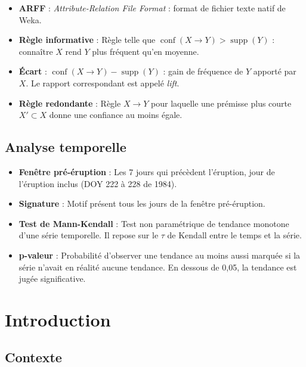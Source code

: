 \documentclass[12pt, a4paper]{article}
\begin{document}
\begin{itemize}[itemsep=3pt]
  \item \textbf{\color{NuitBleue}ARFF} : \emph{Attribute-Relation File Format} : format de fichier texte natif de Weka.
  \item \textbf{\color{NuitBleue}Règle informative} : Règle telle que $\operatorname{conf}(X \rightarrow Y) > \operatorname{supp}(Y)$ : connaître $X$ rend $Y$ plus fréquent qu'en moyenne.
  \item \textbf{\color{NuitBleue}Écart} : $\operatorname{conf}(X \rightarrow Y) - \operatorname{supp}(Y)$ : gain de fréquence de $Y$ apporté par $X$. Le rapport correspondant est appelé \emph{lift}.
  \item \textbf{\color{NuitBleue}Règle redondante} : Règle $X \rightarrow Y$ pour laquelle une prémisse plus courte $X' \subset X$ donne une confiance au moins égale.
\end{itemize}

\subsection*{Analyse temporelle}
\begin{itemize}[itemsep=3pt]
  \item \textbf{\color{NuitBleue}Fenêtre pré-éruption} : Les 7 jours qui précèdent l'éruption, jour de l'éruption inclus (DOY 222 à 228 de 1984).
  \item \textbf{\color{NuitBleue}Signature} : Motif présent tous les jours de la fenêtre pré-éruption.
  \item \textbf{\color{NuitBleue}Test de Mann-Kendall} : Test non paramétrique de tendance monotone d'une série temporelle. Il repose sur le $\tau$ de Kendall entre le temps et la série.
  \item \textbf{\color{NuitBleue}p-valeur} : Probabilité d'observer une tendance au moins aussi marquée si la série n'avait en réalité aucune tendance. En dessous de 0,05, la tendance est jugée significative.
\end{itemize}
\newpage

\section{Introduction}

\subsection{Contexte}
\end{document}
